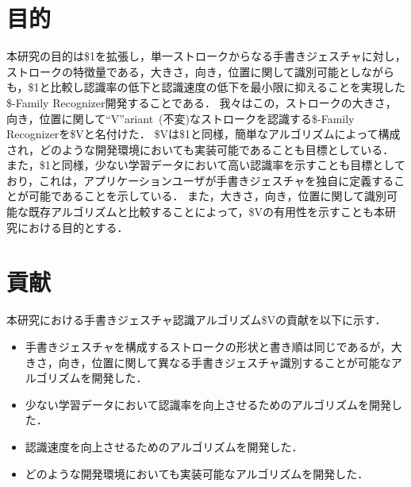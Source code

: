 \section{目的}
本研究の目的は\$1を拡張し，単一ストロークからなる手書きジェスチャに対し，ストロークの特徴量である，大きさ，向き，位置に関して識別可能としながらも，\$1と比較し認識率の低下と認識速度の低下を最小限に抑えることを実現した\$-Family Recognizer開発することである．
我々はこの，ストロークの大きさ，向き，位置に関して``V''ariant~(不変)なストロークを認識する\$-Family Recognizerを\$Vと名付けた．
\$Vは\$1と同様，簡単なアルゴリズムによって構成され，どのような開発環境においても実装可能であることも目標としている．
また，\$1と同様，少ない学習データにおいて高い認識率を示すことも目標としており，これは，アプリケーションユーザが手書きジェスチャを独自に定義することが可能であることを示している．
また，大きさ，向き，位置に関して識別可能な既存アルゴリズムと比較することによって，\$Vの有用性を示すことも本研究における目的とする．



\section{貢献}
本研究における手書きジェスチャ認識アルゴリズム\$Vの貢献を以下に示す．
\begin{itemize}
\item 手書きジェスチャを構成するストロークの形状と書き順は同じであるが，大きさ，向き，位置に関して異なる手書きジェスチャ識別することが可能なアルゴリズムを開発した．
\item 少ない学習データにおいて認識率を向上させるためのアルゴリズムを開発した．
\item 認識速度を向上させるためのアルゴリズムを開発した．
\item どのような開発環境においても実装可能なアルゴリズムを開発した．
\end{itemize}

